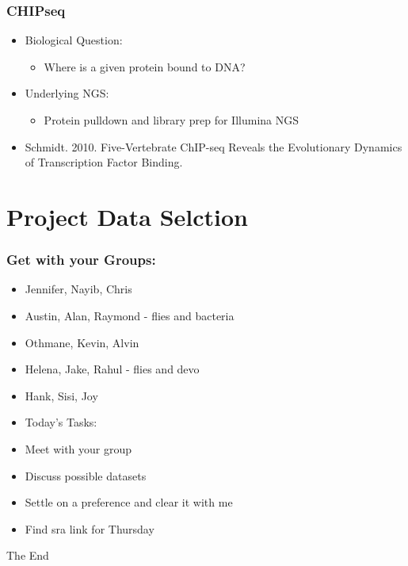 \documentclass[14pt]{beamer}
\begin{document}
\begin{frame}
\frametitle{CHIPseq}
\begin{itemize}
	\item<+-> Biological Question:
	\begin{itemize}
		\item<+-> Where is a given protein bound to DNA?
	\end{itemize}
	\item<+-> Underlying NGS:
	\begin{itemize}
		\item<+-> Protein pulldown and library prep for Illumina NGS
	\end{itemize}
	\item<+-> Schmidt. 2010. Five-Vertebrate ChIP-seq Reveals the Evolutionary Dynamics of Transcription Factor Binding.
\end{itemize}
\end{frame}

\section{Project Data Selction}

\begin{frame}
\frametitle{Get with your Groups:}
	\begin{itemize}
	\item Jennifer, Nayib, Chris
	\item Austin, Alan, Raymond - flies and bacteria
	\item Othmane, Kevin, Alvin
	\item Helena, Jake, Rahul - flies and devo
	\item Hank, Sisi, Joy
	\end{itemize}
\end{frame}

\begin{frame}
	\begin{itemize}
		\item {\Large Today's Tasks:}
		\item Meet with your group
		\item Discuss possible datasets
		\item Settle on a preference and clear it with me
		\item Find sra link for Thursday
	\end{itemize}
\end{frame}


\begin{frame}
\Huge{\centerline{The End}}
\end{frame}

\end{document}
